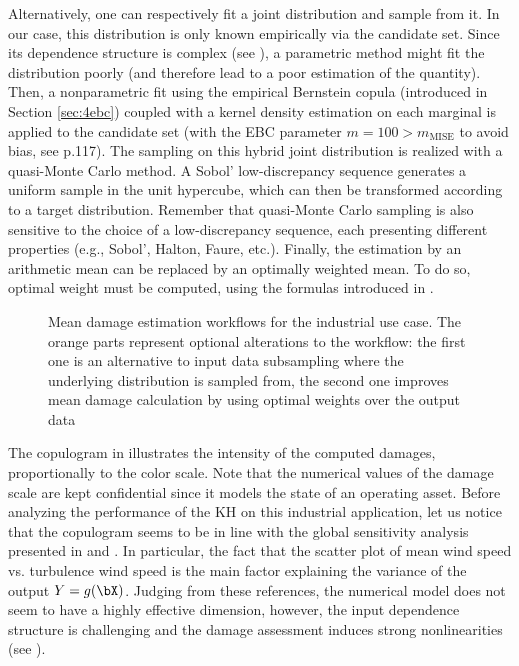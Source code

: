 Alternatively, one can respectively fit a joint distribution and sample from it. 
In our case, this distribution is only known empirically via the candidate set. 
Since its dependence structure is complex (see ), a parametric method might fit the distribution poorly (and therefore lead to a poor estimation of the quantity). 
Then, a nonparametric fit using the empirical Bernstein copula (introduced in Section \ref{sec:4ebc}) coupled with a kernel density estimation on each marginal is applied to the candidate set (with the EBC parameter $m=100 > m_{\mbox{MISE}}$ to avoid bias, see \citet{lasserre_2022} p.117). 
The sampling on this hybrid joint distribution is realized with a quasi-Monte Carlo method. 
A Sobol' low-discrepancy sequence generates a uniform sample in the unit hypercube, which can then be transformed according to a target distribution. 
Remember that quasi-Monte Carlo sampling is also sensitive to the choice of a low-discrepancy sequence, each presenting different properties (e.g., Sobol', Halton, Faure, etc.). 
Finally, the estimation by an arithmetic mean can be replaced by an optimally weighted mean. 
To do so, optimal weight must be computed, using the formulas introduced in .

\begin{figure}[!h]
    \centering
    
    \caption{Mean damage estimation workflows for the industrial use case. 
    The orange parts represent optional alterations to the workflow: 
    the first one is an alternative to input data subsampling where the underlying distribution is sampled from, 
    the second one improves mean damage calculation by using optimal weights over the output data}
    \label{fig:sampling_diagram}
\end{figure}


The copulogram in  illustrates the intensity of the computed damages, proportionally to the color scale. 
Note that the numerical values of the damage scale are kept confidential since it models the state of an operating asset.
Before analyzing the performance of the KH on this industrial application, let us notice that the copulogram  seems to be in line with the global sensitivity analysis presented in \cite{murcia_dimitrov_2018} and \cite{li_zhan_2020}. 
In particular, the fact that the scatter plot of mean wind speed vs. turbulence wind speed is the main factor explaining the variance of the output $Y=g(\bX)$. 
Judging from these references, the numerical model does not seem to have a highly effective dimension, however, the input dependence structure is challenging and the damage assessment induces strong nonlinearities (see ). 

